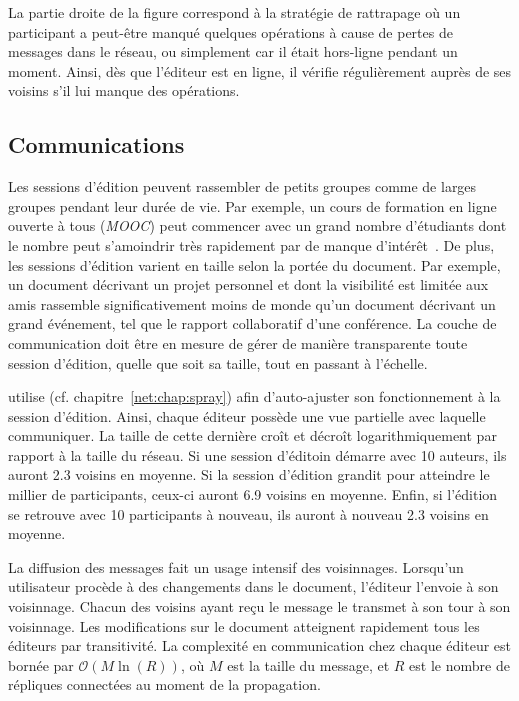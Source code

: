 La partie droite de la figure correspond à la stratégie de rattrapage où un
participant a peut-être manqué quelques opérations à cause de pertes de messages
dans le réseau, ou simplement car il était hors-ligne pendant un moment. Ainsi,
dès que l'éditeur est en ligne, il vérifie régulièrement auprès de ses voisins
s'il lui manque des opérations.


\subsection{Communications}

Les sessions d'édition peuvent rassembler de petits groupes comme de larges
groupes pendant leur durée de vie. Par exemple, un cours de formation en ligne
ouverte à tous (\emph{MOOC}) peut commencer avec un grand nombre d'étudiants
dont le nombre peut s'amoindrir très rapidement par de manque
d'intérêt~\cite{breslow2013studying}. De plus, les sessions d'édition varient en
taille selon la portée du document. Par exemple, un document décrivant un projet
personnel et dont la visibilité est limitée aux amis rassemble significativement
moins de monde qu'un document décrivant un grand événement, tel que le rapport
collaboratif d'une conférence. La couche de communication doit être en mesure de
gérer de manière transparente toute session d'édition, quelle que soit sa
taille, tout en passant à l'échelle.

\CRATE utilise \SPRAY (cf. chapitre~\ref{net:chap:spray}) afin
d'auto-ajuster son fonctionnement à la session d'édition. Ainsi, chaque éditeur
possède une vue partielle avec laquelle communiquer. La taille de cette dernière
croît et décroît logarithmiquement par rapport à la taille du réseau. Si une
session d'éditoin démarre avec 10 auteurs, ils auront 2.3 voisins en moyenne. Si
la session d'édition grandit pour atteindre le millier de participants, ceux-ci
auront 6.9 voisins en moyenne. Enfin, si l'édition se retrouve avec 10
participants à nouveau, ils auront à nouveau 2.3 voisins en moyenne.

La diffusion des messages fait un usage intensif des voisinnages. Lorsqu'un
utilisateur procède à des changements dans le document, l'éditeur l'envoie à son
voisinnage. Chacun des voisins ayant reçu le message le transmet à son tour à
son voisinnage. Les modifications sur le document atteignent rapidement tous les
éditeurs par transitivité. La complexité en communication chez chaque éditeur
est bornée par $\mathcal{O}(M\ln(R))$, où $M$ est la taille du message, et
$R$ est le nombre de répliques connectées au moment de la propagation.

